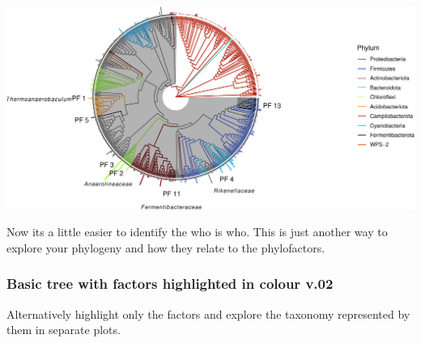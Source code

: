 \documentclass[
]{book}
\begin{document}
\includegraphics{gitbook-demo_files/figure-latex/coloredtree3-1.pdf}

Now its a little easier to identify the who is who. This is just another way to explore your phylogeny and how they relate to the phylofactors.

\hypertarget{basic-tree-with-factors-highlighted-in-colour-v.02}{%
\subsubsection{Basic tree with factors highlighted in colour v.02}\label{basic-tree-with-factors-highlighted-in-colour-v.02}}

Alternatively highlight only the factors and explore the taxonomy represented by them in separate plots.
\end{document}
